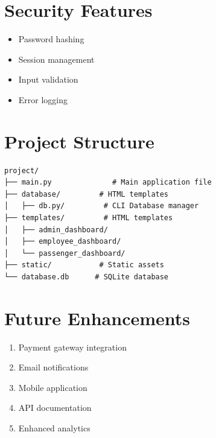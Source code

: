 \documentclass{article}
\begin{document}
\section{Security Features}
\begin{itemize}
    \item Password hashing
    \item Session management
    \item Input validation
    \item Error logging
\end{itemize}

\section{Project Structure}
\begin{verbatim}
project/
├── main.py              # Main application file         
├── database/         # HTML templates
│   ├── db.py/         # CLI Database manager
├── templates/         # HTML templates
│   ├── admin_dashboard/
│   ├── employee_dashboard/
│   └── passenger_dashboard/
├── static/           # Static assets
└── database.db      # SQLite database
\end{verbatim}

\section{Future Enhancements}
\begin{enumerate}
    \item Payment gateway integration
    \item Email notifications
    \item Mobile application
    \item API documentation
    \item Enhanced analytics
\end{enumerate}
\end{document}
